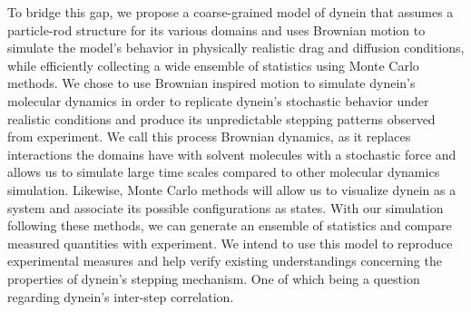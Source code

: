 To bridge this gap, we propose a coarse-grained model of dynein that assumes a particle-rod structure for its various domains and uses Brownian motion to simulate the model’s behavior in physically realistic drag and diffusion conditions, while efficiently collecting a wide ensemble of statistics using Monte Carlo methods. We chose to use Brownian inspired motion to simulate dynein’s molecular dynamics in order to replicate dynein’s stochastic behavior under realistic conditions and produce its unpredictable stepping patterns observed from experiment. We call this process Brownian dynamics, as it replaces interactions the domains have with solvent molecules with a stochastic force and allows us to simulate large time scales compared to other molecular dynamics simulation. Likewise, Monte Carlo methods will allow us to visualize dynein as a system and associate its possible configurations as states. With our simulation following these methods, we can generate an ensemble of statistics and compare measured quantities with experiment. We intend to use this model to reproduce experimental measures and help verify existing understandings concerning the properties of dynein’s stepping mechanism. One of which being a question regarding dynein’s inter-step correlation. 